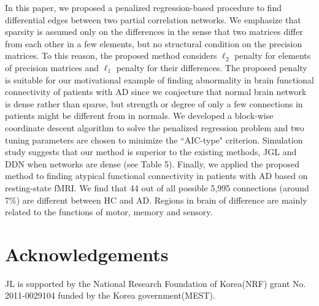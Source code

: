\documentclass[useAMS,usenatbib,referee]{bio}
\begin{document}
{{In this paper, we proposed a penalized regression-based procedure to find differential edges between two partial correlation networks.  
We emphasize that sparsity is assumed only on the differences in the sense that two matrices differ from each other in a few elements, but no structural condition on the precision matrices. To this reason, the proposed method considers $\ell_2$ penalty for elements of precision matrices and $\ell_1$ penalty for their differences.
The proposed penalty is suitable for our motivational example of finding abnormality in brain functional connectivity of patients with AD since we conjecture that normal brain network is dense rather than sparse, but strength or degree of only a few connections in patients might be different from in normals.
We developed a block-wise coordinate descent algorithm to solve the penalized regression problem and two tuning parameters are chosen to minimize the ``AIC-type" criterion.
Simulation study suggests that our method is superior to the existing methods, JGL and DDN when networks are dense (see Table 5). 
Finally, we applied the proposed method to finding atypical functional connectivity in patients with AD based on resting-state fMRI. 
We find that 44 out of all possible 5,995 connections (around 7\%) are different between HC and AD. Regions in brain of difference are mainly related to the functions of motor, memory and sensory. 

\section*{Acknowledgements}
JL is supported by the National Research Foundation of Korea(NRF) grant No. 2011-0029104 funded by the Korea government(MEST).








}}
\end{document}
